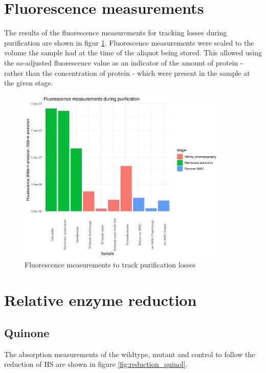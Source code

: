 \section{Fluorescence measurements}

The results of the fluorescence measurements for tracking losses during
purification are shown in figur \ref{fig:purification_fluorescence}.
Fluorescence measurements were scaled to the volume the sample had at the time
of the aliquot being stored. This allowed using the so-adjusted fluorescence
value as an indicator of the amount of protein - rather than the concentration
of protein - which were present in the sample at the given stage.

\begin{figure}
	\centering
	\includegraphics[width=0.9\textwidth]{img/purification_fluorescence.png}
	\caption{Fluorescence measurements to track purification losses}
	\label{fig:purification_fluorescence}
\end{figure}

\section{Relative enzyme reduction}

\subsection{Quinone}

The absorption measurements of the wildtype, mutant and control to follow the
reduction of HS are shown in figure \ref{fig:reduction_quinol}.

